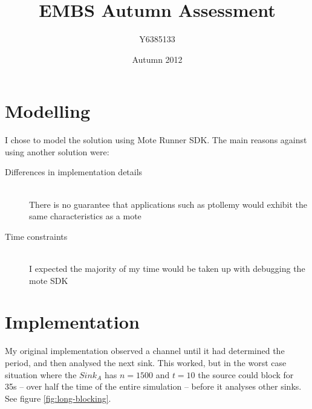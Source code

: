 \documentclass{article}
\title{EMBS Autumn Assessment}
\author{Y6385133}
\date{Autumn 2012}
\begin{document}
\maketitle

\section{Modelling}
I chose to model the solution using Mote Runner SDK. The main reasons against using another solution were:

\begin{description}
    \item[Differences in implementation details] \hfill \\
        There is no guarantee that applications such as ptollemy would exhibit the same characteristics as a mote
    \item[Time constraints] \hfill \\
        I expected the majority of my time would be taken up with debugging the mote {SDK}
\end{description}

\section{Implementation}

My original implementation observed a channel until it had determined the period, and then analysed
the next sink. This worked, but in the worst case situation where the $Sink_A$ has $n=1500$ and $t=10$ the source could block
for ~ 35s -- over half the time of the entire simulation -- before it analyses other sinks. See figure \ref{fig:long-blocking}.
\end{document}
